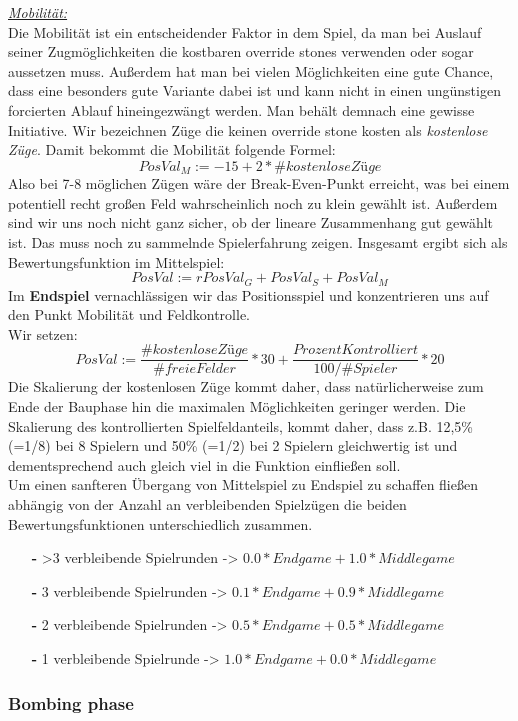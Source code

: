\underline{\textit{Mobilität:}}\\
Die Mobilität ist ein entscheidender Faktor in dem Spiel, da man bei Auslauf seiner Zugmöglichkeiten die kostbaren override stones verwenden oder sogar aussetzen muss. Außerdem hat man bei vielen Möglichkeiten eine gute Chance, dass eine besonders gute Variante dabei ist und kann nicht in einen ungünstigen forcierten Ablauf hineingezwängt werden. Man behält demnach eine gewisse Initiative. Wir bezeichnen Züge die keinen override stone kosten als \textit{kostenlose Züge}. Damit bekommt die Mobilität folgende Formel:
$$PosVal_M := -15 + 2*\#kostenloseZüge$$
Also bei 7-8 möglichen Zügen wäre der Break-Even-Punkt erreicht, was bei einem potentiell recht großen Feld wahrscheinlich noch zu klein gewählt ist. Außerdem sind wir uns noch nicht ganz sicher, ob der lineare Zusammenhang gut gewählt ist. Das muss noch zu sammelnde Spielerfahrung zeigen.
Insgesamt ergibt sich als Bewertungsfunktion im Mittelspiel:
$$PosVal := rPosVal_G + PosVal_S + PosVal_M$$
Im \textbf{Endspiel} vernachlässigen wir das Positionsspiel und konzentrieren uns auf den Punkt Mobilität und Feldkontrolle.\\
Wir setzen:$$PosVal := \dfrac{\#kostenloseZüge}{\#freieFelder} * 30 + \dfrac{ProzentKontrolliert}{100/\#Spieler} * 20$$
Die Skalierung der kostenlosen Züge kommt daher, dass natürlicherweise zum Ende der Bauphase hin die maximalen Möglichkeiten geringer werden. Die Skalierung des kontrollierten Spielfeldanteils, kommt daher, dass z.B. 12,5\% (=1/8) bei 8 Spielern und 50\% (=1/2) bei 2 Spielern gleichwertig ist und dementsprechend auch gleich viel in die Funktion einfließen soll.\\
Um einen sanfteren Übergang von Mittelspiel zu Endspiel zu schaffen fließen abhängig von der Anzahl an verbleibenden Spielzügen die beiden Bewertungsfunktionen unterschiedlich zusammen.
\begin{enumerate}
\item[\textbf{-}] >3 verbleibende Spielrunden -> $0.0*Endgame + 1.0*Middlegame$
\item[\textbf{-}] 3 verbleibende Spielrunden -> $0.1*Endgame + 0.9*Middlegame$
\item[\textbf{-}] 2 verbleibende Spielrunden -> $0.5*Endgame + 0.5*Middlegame$
\item[\textbf{-}] 1 verbleibende Spielrunde -> $1.0*Endgame + 0.0*Middlegame$
\end{enumerate}

\subsubsection{Bombing phase}